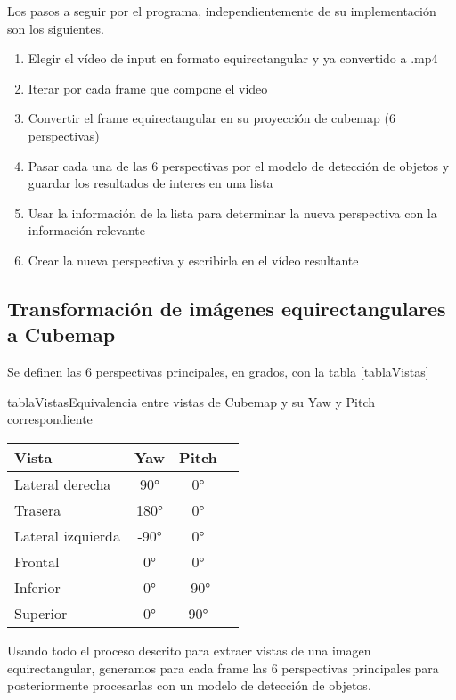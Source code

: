 Los pasos a seguir por el programa, independientemente de su implementación son los siguientes.
\begin{enumerate}
	\item Elegir el vídeo de input en formato equirectangular y ya convertido a .mp4
	\item Iterar por cada frame que compone el video
	\item Convertir el frame equirectangular en su proyección de cubemap (6 perspectivas)
	\item Pasar cada una de las 6 perspectivas por el modelo de detección de objetos y  guardar los resultados de interes en una lista
	\item Usar la información de la lista para determinar la nueva perspectiva con la información relevante
	\item Crear la nueva perspectiva y escribirla en el vídeo resultante

\end{enumerate}

\subsection{Transformación de imágenes equirectangulares a Cubemap}

Se definen las 6 perspectivas principales, en grados, con la tabla \ref{tablaVistas}

\begin{table}{tablaVistas}{Equivalencia entre vistas de Cubemap y su Yaw y Pitch correspondiente}
	\begin{tabular}{lccc}
		\toprule
		\textbf{Vista} & \textbf{Yaw} & \textbf{Pitch} & \\
		\midrule
		Lateral derecha & 90° & 0° & \\
		Trasera & 180° & 0° & \\
		Lateral izquierda & -90° & 0° & \\
		Frontal & 0° & 0° & \\
		Inferior & 0° & -90° & \\
		Superior & 0° & 90° & \\
		\bottomrule
	\end{tabular}
\end{table}

Usando todo el proceso descrito para extraer vistas de una imagen equirectangular, generamos para cada frame las 6 perspectivas principales para posteriormente procesarlas con un modelo de detección de objetos.

